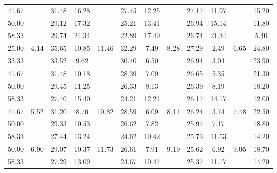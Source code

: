 \begin{table}
\begin{center}
\begin{tabular}{cccccccccccc}
		41.67	&&31.48	&16.28	&&27.45	&12.25	&&27.17	&11.97	&&15.20\\
		50.00	&&29.12	&17.32	&&25.21	&13.41	&&26.94	&15.14	&&11.80\\
		58.33	&&29.74	&24.34	&&22.89	&17.49	&&26.74	&21.34	&&5.40\\
		\midrule
		25.00	&\multirow{5}{*}{4.14}	&35.65	&10.85	&\multirow{5}{*}{11.46}	&32.29	&7.49	&\multirow{5}{*}{8.28}	&27.29	&2.49	&\multirow{5}{*}{6.65}	&24.80\\
		33.33	&&33.52	&9.62	&&30.40	&6.50	&&26.94	&3.04	&&23.90\\
		41.67	&&31.48	&10.18	&&28.39	&7.09	&&26.65	&5.35	&&21.30\\
		50.00	&&29.45	&11.25	&&26.33	&8.13	&&26.39	&8.19	&&18.20\\
		58.33	&&27.40	&15.40	&&24.21	&12.21	&&26.17	&14.17	&&12.00\\
		\midrule
		41.67	&\multirow{3}{*}{5.52}	&31.20	&8.70	&\multirow{3}{*}{10.82}	&28.59	&6.09	&\multirow{3}{*}{8.11}	&26.24	&3.74	&\multirow{3}{*}{7.48}	&22.50\\
		50.00	&&29.33	&10.53	&&26.62	&7.82	&&25.97	&7.17	&&18.80\\
		58.33	&&27.44	&13.24	&&24.62	&10.42	&&25.73	&11.53	&&14.20\\
		\midrule
		50.00	&\multirow{2}{*}{6.90}	&29.07	&10.37	&\multirow{2}{*}{11.73}	&26.61	&7.91	&\multirow{2}{*}{9.19}	&25.62	&6.92	&\multirow{2}{*}{9.05}		&18.70\\
		58.33	&&27.29	&13.09	&&24.67	&10.47	&&25.37	&11.17	&&14.20\\
		\bottomrule
	\end{tabular}
	\end{center}
	\label{tab:EfficiencyComparison}
\end{table}

